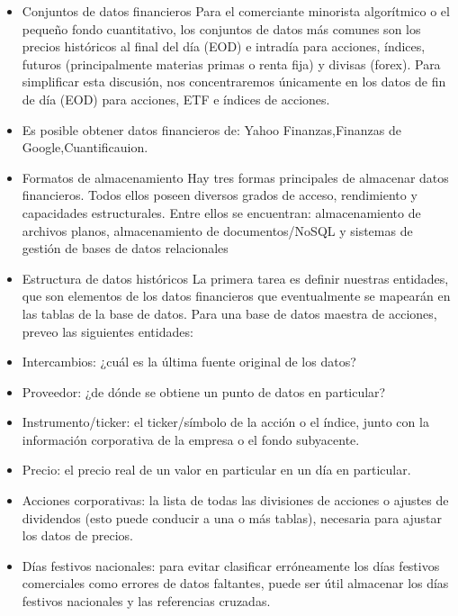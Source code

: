 \documentclass{article}
\begin{document}
\begin{itemize}
\item  Conjuntos de datos financieros
Para el comerciante minorista algorítmico o el pequeño fondo cuantitativo, los conjuntos de datos más comunes son los precios históricos al final del día (EOD) e intradía para acciones, índices, futuros (principalmente materias primas o renta fija) y divisas (forex). Para simplificar esta discusión, nos concentraremos únicamente en los datos de fin de día (EOD) para acciones, ETF e índices de acciones.
\item Es posible obtener datos financieros de:
Yahoo Finanzas,Finanzas de Google,Cuantificauion.
\item  Formatos de almacenamiento
Hay tres formas principales de almacenar datos financieros. Todos ellos poseen diversos grados de acceso, rendimiento y capacidades estructurales. Entre ellos se encuentran: almacenamiento de archivos planos, almacenamiento de documentos/NoSQL y sistemas de gestión de bases de datos relacionales
 
 \item Estructura de datos históricos
La primera tarea es definir nuestras entidades, que son elementos de los datos financieros que eventualmente se mapearán en las tablas de la base de datos. Para una base de datos maestra de acciones, preveo las siguientes entidades:

\item  Intercambios: ¿cuál es la última fuente original de los datos?
\item Proveedor: ¿de dónde se obtiene un punto de datos en particular?
\item Instrumento/ticker: el ticker/símbolo de la acción o el índice, junto con la información corporativa de la empresa o el fondo subyacente.
\item Precio: el precio real de un valor en particular en un día en particular.
\item Acciones corporativas: la lista de todas las divisiones de acciones o ajustes de dividendos (esto puede conducir a una o más tablas), necesaria para ajustar los datos de precios.
\item Días festivos nacionales: para evitar clasificar erróneamente los días festivos comerciales como errores de datos faltantes, puede ser útil almacenar los días festivos nacionales y las referencias cruzadas.
\end{itemize}
 
\end{document}
